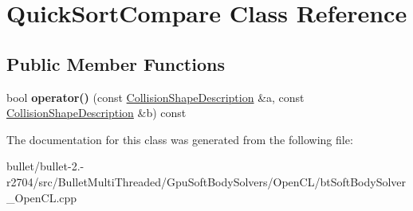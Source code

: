 \hypertarget{class_quick_sort_compare}{\section{Quick\+Sort\+Compare Class Reference}
\label{class_quick_sort_compare}
}
\subsection*{Public Member Functions}
\begin{DoxyCompactItemize}
\item 
\hypertarget{class_quick_sort_compare_a01118c2a066c6bf71b154fad9a72909b}{bool {\bfseries operator()} (const \hyperlink{struct_collision_shape_description}{Collision\+Shape\+Description} \&a, const \hyperlink{struct_collision_shape_description}{Collision\+Shape\+Description} \&b) const }\label{class_quick_sort_compare_a01118c2a066c6bf71b154fad9a72909b}

\end{DoxyCompactItemize}


The documentation for this class was generated from the following file\+:\begin{DoxyCompactItemize}
\item 
bullet/bullet-\/2.-\/r2704/src/\+Bullet\+Multi\+Threaded/\+Gpu\+Soft\+Body\+Solvers/\+Open\+C\+L/bt\+Soft\+Body\+Solver\+\_\+\+Open\+C\+L.\+cpp\end{DoxyCompactItemize}
